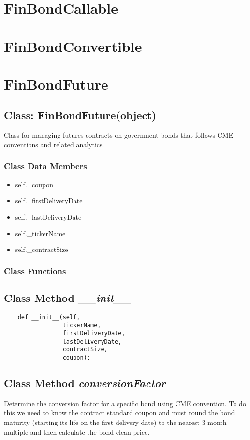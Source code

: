 \documentclass[twoside,11pt]{book}
\begin{document}
\newpage
\section{FinBondCallable}

\newpage
\section{FinBondConvertible}

\newpage
\section{FinBondFuture}

\subsection{Class: FinBondFuture(object)}
Class for managing futures contracts on government bonds that follows CME conventions and related analytics. 

\subsubsection{Class Data Members}
\begin{itemize}
\item{self.\_coupon}
\item{self.\_firstDeliveryDate}
\item{self.\_lastDeliveryDate}
\item{self.\_tickerName}
\item{self.\_contractSize}
\end{itemize}

\subsubsection{Class Functions}

\subsection{Class Method {\it \_\_init\_\_}}


\begin{lstlisting}
    def __init__(self,
                 tickerName,
                 firstDeliveryDate, 
                 lastDeliveryDate, 
                 contractSize, 
                 coupon):
\end{lstlisting}

\subsection{Class Method {\it conversionFactor}}
Determine the conversion factor for a specific bond using CME convention. To do this we need to know the contract standard coupon and must round the bond maturity (starting its life on the first delivery date) to the nearest 3 month multiple and then calculate the bond clean price.  
\end{document}

